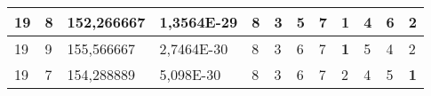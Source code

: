 \documentclass[conference]{IEEEtran}
\begin{document}
\begin{table*}[]
\begin{tabular}{|llll|llllllll|}
\multicolumn{1}{|l|}{19}                                                    & \multicolumn{1}{l|}{8}                                                        & \multicolumn{1}{l|}{152,266667}                                                   & 1,3564E-29                     & \multicolumn{1}{l|}{8}                                                  & \multicolumn{1}{l|}{3}                                                  & \multicolumn{1}{l|}{5}                                                  & \multicolumn{1}{l|}{7}                                                  & \multicolumn{1}{l|}{\textbf{1}}                                         & \multicolumn{1}{l|}{4}                                                  & \multicolumn{1}{l|}{6}                                                  & 2                          \\ \hline
\multicolumn{1}{|l|}{19}                                                    & \multicolumn{1}{l|}{9}                                                        & \multicolumn{1}{l|}{155,566667}                                                   & 2,7464E-30                     & \multicolumn{1}{l|}{8}                                                  & \multicolumn{1}{l|}{3}                                                  & \multicolumn{1}{l|}{6}                                                  & \multicolumn{1}{l|}{7}                                                  & \multicolumn{1}{l|}{\textbf{1}}                                         & \multicolumn{1}{l|}{5}                                                  & \multicolumn{1}{l|}{4}                                                  & 2                          \\ \hline
\multicolumn{1}{|l|}{19}                                                    & \multicolumn{1}{l|}{7}                                                        & \multicolumn{1}{l|}{154,288889}                                                   & 5,098E-30                      & \multicolumn{1}{l|}{8}                                                  & \multicolumn{1}{l|}{3}                                                  & \multicolumn{1}{l|}{6}                                                  & \multicolumn{1}{l|}{7}                                                  & \multicolumn{1}{l|}{2}                                                  & \multicolumn{1}{l|}{4}                                                  & \multicolumn{1}{l|}{5}                                                  & \textbf{1}                 \\ \hline

\end{tabular}
\end{table*}
\end{document}
